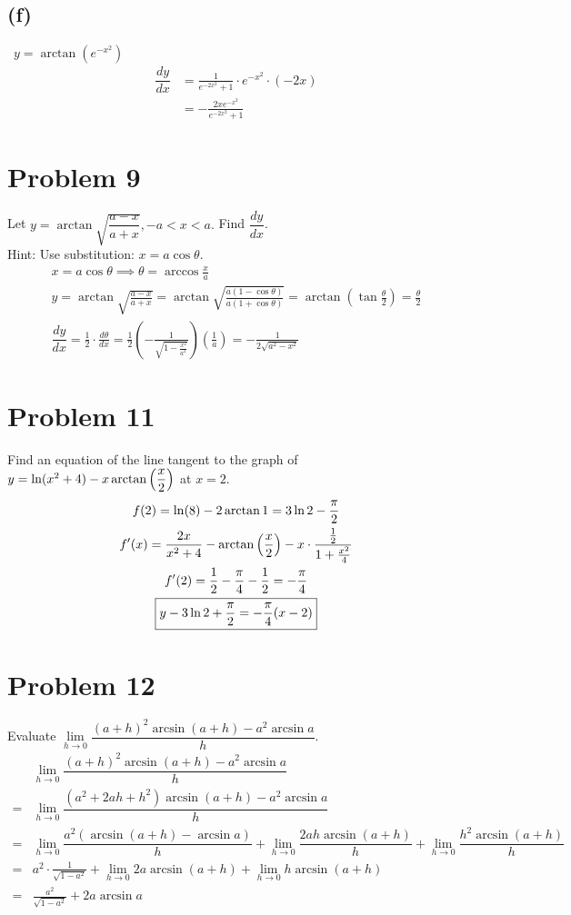 \documentclass[12pt]{article}
\newcommand*{\paren}[1]{\ensuremath\left(#1\right)}
\newcommand{\dydx}{\dfrac{dy}{dx}}
\newcommand{\problem}[1]{\section{Problem #1}}
\newcommand{\subproblem}[1]{\subsection{(#1)} \,}
\begin{document}
\subproblem{f}
$y = \arctan(e^{-x^2})$
\begin{align*}
    \dydx
    &=\frac{1}{e^{-2x^2}+1}\cdot e^{-x^2}\cdot (-2x)\\
    &=\boxed{-\frac{2xe^{-x^2}}{e^{-2x^2}+1}}
\end{align*}

\problem{9}
Let $y=\arctan \sqrt{\dfrac{a-x}{a+x}}, -a<x<a.$ Find $\dydx$. \\

Hint: Use substitution: $x=a\cos \theta.$
\begin{gather*}
    x=a\cos \theta \implies \theta =\arccos \frac{x}{a}\\
    y=\arctan\sqrt{\frac{a-x}{a+x}}=\arctan\sqrt{\frac{a(1-\cos \theta)}{a(1+\cos \theta)}}=\arctan (\tan \frac{\theta}{2})=\frac{\theta}{2}\\
    \dydx=\frac{1}{2}\cdot \frac{d\theta}{dx}=\frac{1}{2}(-\frac{1}{\sqrt{1-\frac{x^2}{a^2}}})(\frac{1}{a})=\boxed{-\frac{1}{2\sqrt{a^2-x^2}}}
\end{gather*}

\problem{11}
Find an equation of the line tangent to the graph of $y=\ln(x^2+4)-x\arctan \paren{\dfrac{x}{2}}$ at $x=2$.
\begin{gather*}
    f(2)=\ln (8)-2\arctan 1=3\ln 2-\frac{\pi}{2}\\
    f'(x)=\frac{2x}{x^2+4}-\arctan \paren{\frac{x}{2}}-x\cdot \frac{\frac{1}{2}}{1+\frac{x^2}{4}}\\
    f'(2)=\frac{1}{2}-\frac{\pi}{4}-\frac{1}{2}=-\frac{\pi}{4}\\
    \boxed{y-3\ln 2+\frac{\pi}{2}=-\frac{\pi}{4}(x-2)}
\end{gather*}

\problem{12}
Evaluate $\lim\limits_{h \to 0}\dfrac{(a+h)^2\arcsin (a+h)-a^2\arcsin a}{h}$.
\begin{align*}
    &\lim_{h \to 0}\dfrac{(a+h)^2\arcsin (a+h)-a^2\arcsin a}{h}\\
    =&\lim_{h \to 0}\dfrac{(a^2+2ah+h^2)\arcsin (a+h)-a^2\arcsin a}{h}\\
    =&\lim_{h \to 0}\dfrac{a^2(\arcsin (a+h)-\arcsin a)}{h}+\lim_{h \to 0}\dfrac{2ah\arcsin (a+h)}{h}+\lim_{h \to 0}\dfrac{h^2\arcsin (a+h)}{h}\\
    =&a^2\cdot \frac{1}{\sqrt{1-a^2}}+\lim_{h \to 0}2a\arcsin (a+h)+\lim_{h \to 0}h\arcsin (a+h)\\
    =&\boxed{\frac{a^2}{\sqrt{1-a^2}}+2a\arcsin a}
\end{align*}
\end{document}
